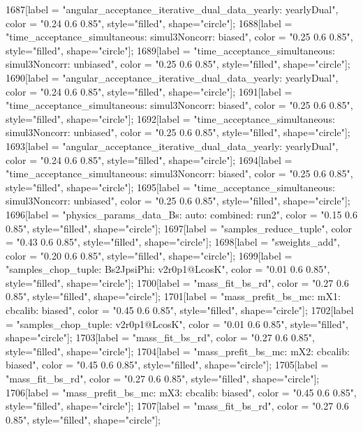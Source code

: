 {	1687[label = "angular_acceptance_iterative_dual_data_yearly\nangacc: yearlyDual", color = "0.24 0.6 0.85", style="filled", shape="circle"];
	1688[label = "time_acceptance_simultaneous\ntimeacc: simul3Noncorr\ntrigger: biased", color = "0.25 0.6 0.85", style="filled", shape="circle"];
	1689[label = "time_acceptance_simultaneous\ntimeacc: simul3Noncorr\ntrigger: unbiased", color = "0.25 0.6 0.85", style="filled", shape="circle"];
	1690[label = "angular_acceptance_iterative_dual_data_yearly\nangacc: yearlyDual", color = "0.24 0.6 0.85", style="filled", shape="circle"];
	1691[label = "time_acceptance_simultaneous\ntimeacc: simul3Noncorr\ntrigger: biased", color = "0.25 0.6 0.85", style="filled", shape="circle"];
	1692[label = "time_acceptance_simultaneous\ntimeacc: simul3Noncorr\ntrigger: unbiased", color = "0.25 0.6 0.85", style="filled", shape="circle"];
	1693[label = "angular_acceptance_iterative_dual_data_yearly\nangacc: yearlyDual", color = "0.24 0.6 0.85", style="filled", shape="circle"];
	1694[label = "time_acceptance_simultaneous\ntimeacc: simul3Noncorr\ntrigger: biased", color = "0.25 0.6 0.85", style="filled", shape="circle"];
	1695[label = "time_acceptance_simultaneous\ntimeacc: simul3Noncorr\ntrigger: unbiased", color = "0.25 0.6 0.85", style="filled", shape="circle"];
	1696[label = "physics_params_data_Bs\nfit: auto\ntrigger: combined\nyear: run2", color = "0.15 0.6 0.85", style="filled", shape="circle"];
	1697[label = "samples_reduce_tuple", color = "0.43 0.6 0.85", style="filled", shape="circle"];
	1698[label = "sweights_add", color = "0.20 0.6 0.85", style="filled", shape="circle"];
	1699[label = "samples_chop_tuple\nmode: Bs2JpsiPhi\nversion: v2r0p1@LcosK", color = "0.01 0.6 0.85", style="filled", shape="circle"];
	1700[label = "mass_fit_bs_rd", color = "0.27 0.6 0.85", style="filled", shape="circle"];
	1701[label = "mass_prefit_bs_mc\nmassbin: mX1\nmassmodel: cbcalib\ntrigger: biased", color = "0.45 0.6 0.85", style="filled", shape="circle"];
	1702[label = "samples_chop_tuple\nversion: v2r0p1@LcosK", color = "0.01 0.6 0.85", style="filled", shape="circle"];
	1703[label = "mass_fit_bs_rd", color = "0.27 0.6 0.85", style="filled", shape="circle"];
	1704[label = "mass_prefit_bs_mc\nmassbin: mX2\nmassmodel: cbcalib\ntrigger: biased", color = "0.45 0.6 0.85", style="filled", shape="circle"];
	1705[label = "mass_fit_bs_rd", color = "0.27 0.6 0.85", style="filled", shape="circle"];
	1706[label = "mass_prefit_bs_mc\nmassbin: mX3\nmassmodel: cbcalib\ntrigger: biased", color = "0.45 0.6 0.85", style="filled", shape="circle"];
	1707[label = "mass_fit_bs_rd", color = "0.27 0.6 0.85", style="filled", shape="circle"];
}
